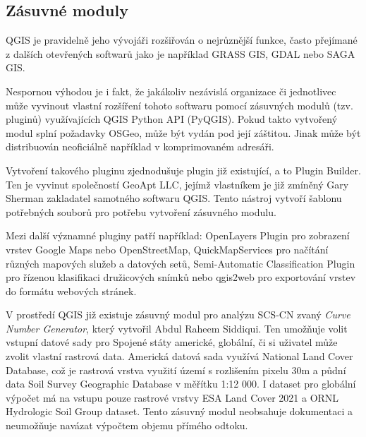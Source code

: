 \documentclass[a4paper,oneside,12pt]{book}
\begin{document}
 \subsection{Zásuvné moduly} \label{moduly}

\hspace{10mm} QGIS je pravidelně jeho vývojáři rozšiřován o nejrůznější funkce, často přejímané z dalších otevřených softwarů jako je například GRASS GIS, GDAL nebo SAGA GIS.\cite{Baghdadi2018}

\hspace{10mm} Nespornou výhodou je i fakt, že jakákoliv nezávislá organizace či jednotlivec může vyvinout vlastní rozšíření tohoto softwaru pomocí zásuvných modulů (tzv. pluginů) využívajících QGIS Python API (PyQGIS). Pokud takto vytvořený modul splní požadavky OSGeo, může být vydán pod její záštitou. Jinak může být distribuován neoficiálně například v komprimovaném adresáři.

\hspace{10mm} Vytvoření takového pluginu zjednodušuje plugin již existující, a to Plugin Builder. Ten je vyvinut společností GeoApt LLC, jejímž vlastníkem je již zmíněný Gary Sherman zakladatel samotného softwaru QGIS. Tento nástroj vytvoří šablonu potřebných souborů pro potřebu vytvoření zásuvného modulu. \cite{QPwvEntkWdxPk0Lz}

\hspace{10mm} Mezi další významné pluginy patří například: OpenLayers Plugin pro zobrazení vrstev Google Maps nebo OpenStreetMap, QuickMapServices pro načítání různých mapových služeb a datových setů, Semi-Automatic Classification Plugin pro řízenou klasifikaci družicových snímků nebo qgis2web pro exportování vrstev do formátu webových stránek. \cite{QPwvEntkWdxPk0Lz}

\hspace{10mm} V prostředí QGIS již existuje zásuvný modul pro analýzu SCS-CN zvaný \textit{Curve Number Generator}, který vytvořil Abdul Raheem Siddiqui. Ten umožňuje volit vstupní datové sady pro Spojené státy americké, globální, či si uživatel může zvolit vlastní rastrová data. Americká datová sada využívá National Land Cover Database, což je rastrová vrstva využití území s rozlišením pixelu 30m a půdní data Soil Survey Geographic Database v měřítku 1:12 000. I dataset pro globální výpočet má na vstupu pouze rastrové vrstvy ESA Land Cover 2021 a ORNL Hydrologic Soil Group dataset. Tento zásuvný modul neobsahuje dokumentaci a neumožňuje navázat výpočtem objemu přímého odtoku. \cite{siddiqui2020}
\end{document}
